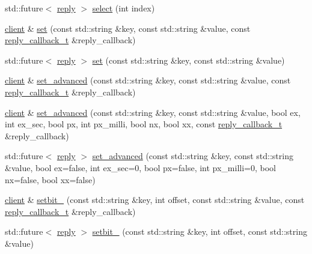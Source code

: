 \begin{DoxyCompactItemize}
\item 
std\+::future$<$ \hyperlink{classcpp__redis_1_1reply}{reply} $>$ \hyperlink{classcpp__redis_1_1client_a5eae97b05129d0571c3b871e1a786434}{select} (int index)
\item 
\hyperlink{classcpp__redis_1_1client}{client} \& \hyperlink{classcpp__redis_1_1client_a6d654139ca804e9ee2ac0d0683878ece}{set} (const std\+::string \&key, const std\+::string \&value, const \hyperlink{classcpp__redis_1_1client_a061a1140d36d2eaeda82b09a0bb3f9f2}{reply\+\_\+callback\+\_\+t} \&reply\+\_\+callback)
\item 
std\+::future$<$ \hyperlink{classcpp__redis_1_1reply}{reply} $>$ \hyperlink{classcpp__redis_1_1client_a734ba95a7e2083fe6bc2e209f94ccab6}{set} (const std\+::string \&key, const std\+::string \&value)
\item 
\hyperlink{classcpp__redis_1_1client}{client} \& \hyperlink{classcpp__redis_1_1client_aac03b242d1a0948a9eb3567624e72622}{set\+\_\+advanced} (const std\+::string \&key, const std\+::string \&value, const \hyperlink{classcpp__redis_1_1client_a061a1140d36d2eaeda82b09a0bb3f9f2}{reply\+\_\+callback\+\_\+t} \&reply\+\_\+callback)
\item 
\hyperlink{classcpp__redis_1_1client}{client} \& \hyperlink{classcpp__redis_1_1client_a60db35e46bcbe36e5264ee04933162fd}{set\+\_\+advanced} (const std\+::string \&key, const std\+::string \&value, bool ex, int ex\+\_\+sec, bool px, int px\+\_\+milli, bool nx, bool xx, const \hyperlink{classcpp__redis_1_1client_a061a1140d36d2eaeda82b09a0bb3f9f2}{reply\+\_\+callback\+\_\+t} \&reply\+\_\+callback)
\item 
std\+::future$<$ \hyperlink{classcpp__redis_1_1reply}{reply} $>$ \hyperlink{classcpp__redis_1_1client_a208688fdc336009701256722ef7e2a2b}{set\+\_\+advanced} (const std\+::string \&key, const std\+::string \&value, bool ex=false, int ex\+\_\+sec=0, bool px=false, int px\+\_\+milli=0, bool nx=false, bool xx=false)
\item 
\hyperlink{classcpp__redis_1_1client}{client} \& \hyperlink{classcpp__redis_1_1client_a17ecd647ae2e9f11e331d1254a21e0d3}{setbit\+\_\+} (const std\+::string \&key, int offset, const std\+::string \&value, const \hyperlink{classcpp__redis_1_1client_a061a1140d36d2eaeda82b09a0bb3f9f2}{reply\+\_\+callback\+\_\+t} \&reply\+\_\+callback)
\item 
std\+::future$<$ \hyperlink{classcpp__redis_1_1reply}{reply} $>$ \hyperlink{classcpp__redis_1_1client_abbf3233f6c395c5d4bdf7810c80e6c05}{setbit\+\_\+} (const std\+::string \&key, int offset, const std\+::string \&value)

\end{DoxyCompactItemize}
